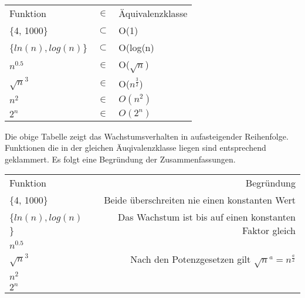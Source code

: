 \begin{tabular}{lcl}
Funktion				& $\in $ 		& Äquivalenzklasse 		\\
\{4, 1000\}				& $\subset$ 	& O(1) 					\\
\{$ln(n), log(n)$\} 	& $\subset$		& O(log(n)				\\
$n^{0.5}$				& $\in$			& O($\sqrt{n}$)			\\
$\sqrt{n}^{3}$			& $\in$			& O($n^{\frac{3}{2}}$)	\\
$n^{2}$					& $\in$			& $O(n^2)$				\\ 
$2^{n}$					& $\in$			& $O(2^n)$				\\ 
\end{tabular}

Die obige Tabelle zeigt das Wachstumsverhalten in aufasteigender Reihenfolge.
Funktionen die in der gleichen Äuqivalenzklasse liegen sind entsprechend geklammert.
Es folgt eine Begründung der Zusammenfassungen.

\begin{tabular}{l|r}
Funktion				& Begründung \\
\{4, 1000\}				& Beide überschreiten nie einen konstanten Wert \\
\{$ln(n), log(n)$\} 	& Das Wachstum ist bis auf einen konstanten Faktor gleich \\
$n^{0.5}$				&	\\
$\sqrt{n}^{3}$			& Nach den Potenzgesetzen gilt $\sqrt{n}^a = n ^{\frac{a}{2}} $\\
$n^{2}$					& \\ 
$2^{n}$					& \\ 
\end{tabular}

